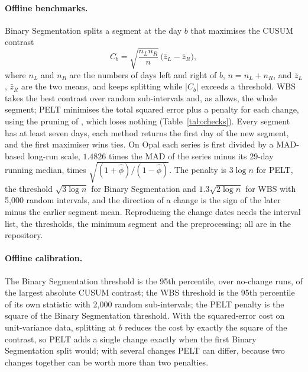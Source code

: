 \paragraph{Offline benchmarks.} Binary Segmentation splits a segment at the day $b$ that maximises the CUSUM contrast
\begin{equation}\label{eq:contrast}
  C_b = \sqrt{\frac{n_L n_R}{n}}\,\big(\bar z_L - \bar z_R\big),
\end{equation}
where $n_L$ and $n_R$ are the numbers of days left and right of $b$, $n = n_L + n_R$, and $\bar z_L$, $\bar z_R$ are the two means, and keeps splitting while $|C_b|$ exceeds a threshold. WBS takes the best contrast over random sub-intervals and, as \citet{fryzlewicz2014} allows, the whole segment; PELT minimises the total squared error plus a penalty for each change, using the pruning of \citet{killick2012}, which loses nothing (Table~\ref{tab:checks}). Every segment has at least seven days, each method returns the first day of the new segment, and the first maximiser wins ties. On Opal each series is first divided by a MAD-based long-run scale, $1.4826$ times the MAD of the series minus its 29-day running median, times $\sqrt{(1+\hat\phi)/(1-\hat\phi)}$. The penalty is $3\log n$ for PELT, the threshold $\sqrt{3\log n}$ for Binary Segmentation and $1.3\sqrt{2\log n}$ for WBS with 5,000 random intervals, and the direction of a change is the sign of the later minus the earlier segment mean. Reproducing the change dates needs the interval list, the thresholds, the minimum segment and the preprocessing; all are in the repository.

\paragraph{Offline calibration.} The Binary Segmentation threshold is the 95th percentile, over no-change runs, of the largest absolute CUSUM contrast; the WBS threshold is the 95th percentile of its own statistic with 2,000 random sub-intervals; the PELT penalty is the square of the Binary Segmentation threshold. With the squared-error cost on unit-variance data, splitting at $b$ reduces the cost by exactly the square of the contrast, so PELT adds a single change exactly when the first Binary Segmentation split would; with several changes PELT can differ, because two changes together can be worth more than two penalties.

